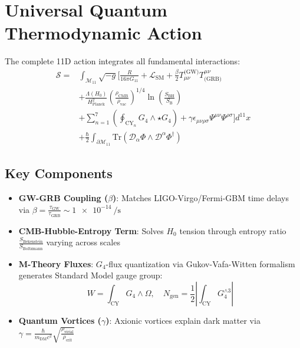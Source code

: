 \documentclass[12pt, a4paper]{article}
\begin{document}
\section{Universal Quantum Thermodynamic Action}
The complete 11D action integrates all fundamental interactions:
\[
\boxed{
\begin{aligned}
\mathcal{S} = & \int_{\mathcal{M}_{11}} \sqrt{-g} \Bigg[ \frac{R}{16\pi G_{11}} + \mathcal{L}_{\text{SM}} + \frac{\beta}{2} T_{\mu\nu}^{\text{(GW)}} T^{\mu\nu}_{\text{(GRB)}} \\
& + \frac{\Lambda(H_0)}{H_{\text{Planck}}^2} \left( \frac{\rho_{\text{CMB}}}{\rho_{\text{vac}}} \right)^{1/4} \ln\left(\frac{S_{\text{BH}}}{S_{\text{B}}}\right) \\
& + \sum_{n=1}^7 \left( \oint_{\text{CY}_n} G_4 \wedge \star G_4 \right) + \gamma \epsilon_{\mu\nu\rho\sigma} \Psi^{\mu\nu} \Psi^{\rho\sigma} \Bigg] d^{11}x \\
& + \frac{\hbar}{2} \int_{\partial\mathcal{M}_{11}} \text{Tr}\left( \mathcal{D}_\alpha \Phi \wedge \mathcal{D}^\alpha \Phi^\dagger \right)
\end{aligned}
}
\]

\subsection{Key Components}
\begin{itemize}
\item \textbf{GW-GRB Coupling ($\beta$)}: Matches LIGO-Virgo/Fermi-GBM time delays via $\beta = \frac{\tau_{\text{GW}}}{\tau_{\text{GRB}}} \sim \SI{1e-14}{\per\second}$

\item \textbf{CMB-Hubble-Entropy Term}: Solves $H_0$ tension through entropy ratio $\frac{S_{\text{Bekenstein}}}{S_{\text{Boltzmann}}}$ varying across scales

\item \textbf{M-Theory Fluxes}: $G_4$-flux quantization via Gukov-Vafa-Witten formalism generates Standard Model gauge group:
\begin{equation}
W = \int_{\text{CY}} G_4 \wedge \Omega,\quad N_{\text{gen}} = \frac{1}{2} \left| \int_{\text{CY}} G_4^{\wedge 3} \right| 
\end{equation}

\item \textbf{Quantum Vortices ($\gamma$)}: Axionic vortices explain dark matter via $\gamma = \frac{\hbar}{m_{\text{DM}} c^2} \sqrt{\frac{\rho_{\text{virial}}}{\rho_{\text{crit}}}}$
\end{itemize}
\end{document}
